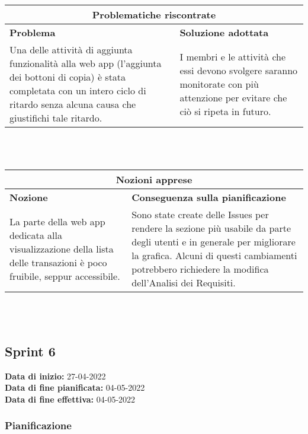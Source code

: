 \documentclass[a4paper, 12pt]{article}
\begin{document}
\begin{center}
    \begin{tabularx}{\textwidth}{|X|X|}
        \hline
        \multicolumn{2}{|c|}{\textbf{Problematiche riscontrate}}\\
        \hline
        \hline
        \textbf{Problema} & \textbf{Soluzione adottata}\\
        \hline
        Una delle attività di aggiunta funzionalità alla web app (l'aggiunta dei bottoni di copia) è stata completata con un intero ciclo di ritardo senza alcuna causa che giustifichi tale ritardo. & I membri e le attività che essi devono svolgere saranno monitorate con più attenzione per evitare che ciò si ripeta in futuro. \\
        \hline
    \end{tabularx}\\[8pt]
    \mbox{}\\
\end{center}

\begin{center}
    \begin{tabularx}{\textwidth}{|X|X|}
        \hline
        \multicolumn{2}{|c|}{\textbf{Nozioni apprese}}\\
        \hline
        \hline
        \textbf{Nozione} & \textbf{Conseguenza sulla pianificazione}\\
        \hline
        La parte della web app dedicata alla visualizzazione della lista delle transazioni è poco fruibile, seppur accessibile. & Sono state create delle Issues per rendere la sezione più usabile da parte degli utenti e in generale per migliorare la grafica. Alcuni di questi cambiamenti potrebbero richiedere la modifica dell'Analisi dei Requisiti. \\
        \hline
    \end{tabularx}\\[8pt]
    \mbox{}\\
\end{center}

\subsection{Sprint 6}
\textbf{Data di inizio:} 27-04-2022\\
\textbf{Data di fine pianificata:} 04-05-2022\\
\textbf{Data di fine effettiva:} 04-05-2022

\subsubsection{Pianificazione}\mbox{}
\end{document}
